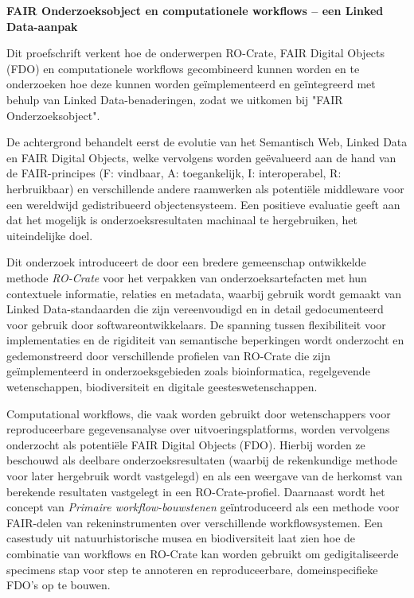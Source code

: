 \textbf{FAIR Onderzoeksobject en computationele workflows – een Linked Data-aanpak}

\begin{small}

Dit proefschrift verkent hoe de onderwerpen RO-Crate, FAIR Digital Objects (FDO) en computationele workflows gecombineerd kunnen worden en te onderzoeken hoe deze kunnen worden geïmplementeerd en geïntegreerd met behulp van Linked Data-benaderingen, zodat we uitkomen bij "FAIR Onderzoeksobject".

De achtergrond behandelt eerst de evolutie van het Semantisch Web, Linked Data en FAIR Digital Objects, welke vervolgens worden geëvalueerd aan de hand van de FAIR-principes (F: vindbaar, A: toegankelijk, I: interoperabel, R: herbruikbaar) en verschillende andere raamwerken als potentiële middleware voor een wereldwijd gedistribueerd objectensysteem. Een positieve evaluatie geeft aan dat het mogelijk is onderzoeksresultaten machinaal te hergebruiken, het uiteindelijke doel.

Dit onderzoek introduceert de door een bredere gemeenschap ontwikkelde methode \emph{RO-Crate} voor het verpakken van onderzoeksartefacten met hun contextuele informatie, relaties en metadata, waarbij gebruik wordt gemaakt van Linked Data-standaarden die zijn vereenvoudigd en in detail gedocumenteerd voor gebruik door softwareontwikkelaars. De spanning tussen flexibiliteit voor implementaties en de rigiditeit van semantische beperkingen wordt onderzocht en gedemonstreerd door verschillende profielen van RO-Crate die zijn geïmplementeerd in onderzoeksgebieden zoals bioinformatica, regelgevende wetenschappen, biodiversiteit en digitale geesteswetenschappen.

Computational workflows, die vaak worden gebruikt door wetenschappers voor reproduceerbare gegevensanalyse over uitvoeringsplatforms, worden vervolgens onderzocht als potentiële FAIR Digital Objects (FDO). Hierbij worden ze beschouwd als deelbare onderzoeksresultaten (waarbij de rekenkundige methode voor later hergebruik wordt vastgelegd) en als een weergave van de herkomst van berekende resultaten vastgelegt in een RO-Crate-profiel. Daarnaast wordt het concept van \emph{Primaire workflow-bouwstenen} geïntroduceerd als een methode voor FAIR-delen van rekeninstrumenten over verschillende workflowsystemen. Een casestudy uit natuurhistorische musea en biodiversiteit laat zien hoe de combinatie van workflows en RO-Crate kan worden gebruikt om gedigitaliseerde specimens stap voor step te annoteren en reproduceerbare, domeinspecifieke FDO's op te bouwen.


\end{small}

